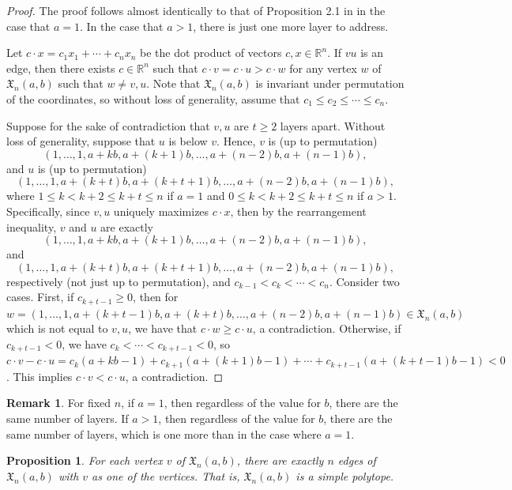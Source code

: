 \documentclass[11pt]{amsart}
\newtheorem{proposition}[theorem]{Proposition}
\theoremstyle{definition}
\newtheorem{remark}[theorem]{Remark}
\newcommand{\0}{\emptyset}
\newcommand{\R}{\mathbb{R}}
\newcommand{\Xn}{\mathfrak{X}_{n}(a,b)}
\begin{document}
\begin{proof}
The proof follows almost identically to that of Proposition 2.1 in \cite{AW} in the case that $a=1$.
In the case that $a >1$, there is just one more layer to address.

Let $c \cdot x = c_1x_1 + \cdots + c_nx_n$ be the dot product of vectors $c,x \in \R^n$. 
If $vu$ is an edge, then there exists $c \in \R^n$ such that $c \cdot v = c \cdot u > c \cdot w$ for any vertex $w$ of $\Xn$ such that $w \neq v,u$.
Note that $\Xn$ is invariant under permutation of the coordinates, so without loss of generality, assume that $c_1 \leq c_2 \leq \cdots \leq c_n$. 

Suppose for the sake of contradiction that $v,u$ are $t \geq 2$ layers apart.
Without loss of generality, suppose that $u$ is below $v$. 
Hence, $v$ is (up to permutation)
$$(1, \ldots, 1, a+kb, a+(k+1)b, \ldots, a+(n-2)b, a+(n-1)b),$$ 
and $u$ is (up to permutation) 
$$(1, \ldots, 1, a+(k+t)b, a+(k+t+1)b, \ldots, a+(n-2)b, a+(n-1)b),$$
where $1 \leq k < k+2 \leq k+t \leq n$ if $a=1$ and $0 \leq k < k+2 \leq k+t \leq n$ if $a > 1$.
Specifically, since $v,u$ uniquely maximizes $c \cdot x$, then by the rearrangement inequality, $v$ and $u$ are exactly 
$$(1, \ldots, 1, a+kb, a+(k+1)b, \ldots, a+(n-2)b, a+(n-1)b),$$ and 
$$(1, \ldots, 1, a+(k+t)b, a+(k+t+1)b, \ldots, a+(n-2)b, a+(n-1)b),$$
respectively (not just up to permutation), and $c_{k-1} < c_k < \cdots < c_n$. 
Consider two cases. 
First, if $c_{k+t-1} \geq 0$, then for $w = (1, \ldots, 1, a+(k+t-1)b, a+(k+t)b, \ldots, a+(n-2)b, a+(n-1)b) \in \Xn$ which is not equal to $v,u$, we have that $c \cdot w \geq c \cdot u$, a contradiction. Otherwise, if $c_{k+t-1}<0$, we have $c_k < \cdots < c_{k+t-1}< 0$, so $c \cdot v - c \cdot u = c_k(a+kb - 1) + c_{k+1}(a+(k+1)b -1) + \cdots + c_{k+t-1}(a+(k+ t -1)b -1) <0$. This implies $c \cdot v < c \cdot u$, a contradiction.
\end{proof}

\begin{remark}
For fixed $n$, if $a=1$, then regardless of the value for $b$, there are the same number of layers.
If $a>1$, then regardless of the value for $b$, there are the same number of layers, which is one more than in the case where $a=1$.
\end{remark}


\begin{proposition}\label{2.2}
For each vertex $v$ of $\Xn$, there are exactly $n$ edges of $\Xn$ with $v$ as one of the vertices. 
That is, $\Xn$ is a simple polytope.
\end{proposition}
\end{document}
